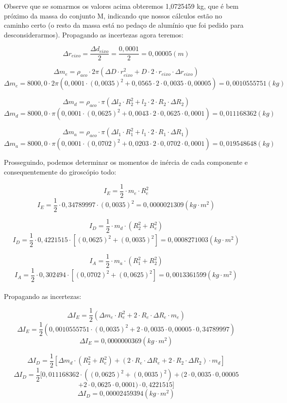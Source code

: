 Observe que se somarmos os valores acima obteremos 1,0725459 kg, que é bem próximo da massa do conjunto M, indicando que nossos cálculos estão no caminho certo (o resto da massa está no pedaço de alumínio que foi pedido para desconsiderarmos). Propagando as incertezas agora teremos:

\[\Delta r_{eixo} = \frac{\Delta d_{eixo}}{2} = \frac{0,0001}{2} = 0,00005 (m)\]

\[ \Delta m_e = \rho_{aco} \cdot 2 \pi \left( \Delta D \cdot r_{eixo}^2 + D \cdot 2 \cdot r_{eixo} \cdot \Delta r_{eixo} \right)\]
\[ \Delta m_e = 8000,0 \cdot 2 \pi \left(0,0001 \cdot (0,0035)^2 + 0,0565 \cdot 2 \cdot 0,0035 \cdot 0,00005 \right) = 0,0010555751 (kg)\]

\[ \Delta m_d = \rho_{aco} \cdot \pi \left( \Delta l_2 \cdot R_2^2 + l_2 \cdot 2 \cdot R_2 \cdot \Delta R_2 \right) \]
\[ \Delta m_d = 8000,0 \cdot \pi \left( 0,0001 \cdot (0,0625)^2 + 0,0043 \cdot 2 \cdot 0,0625 \cdot 0,0001 \right) = 0,011168362 (kg) \]

\[ \Delta m_a = \rho_{aco} \cdot \pi \left( \Delta l_1 \cdot R_1^2 + l_1 \cdot 2 \cdot R_1 \cdot \Delta R_1 \right) \]
\[ \Delta m_a = 8000,0 \cdot \pi \left( 0,0001 \cdot (0,0702)^2 + 0,0203 \cdot 2 \cdot 0,0702 \cdot 0,0001 \right) = 0,019548648 (kg)\]

Prosseguindo, podemos determinar os momentos de inércia de cada componente e consequentemente do giroscópio todo:

\[I_E = \frac{1}{2} \cdot m_e \cdot R_e^2\]
\[I_E = \frac{1}{2} \cdot 0,34789997 \cdot (0,0035)^2 = 0,0000021309 (kg \cdot m^2)\]

\[I_D = \frac{1}{2} \cdot m_d \cdot (R_2^2 + R_e^2)\]
\[I_D = \frac{1}{2} \cdot 0,4221515 \cdot [(0,0625)^2 + (0,0035)^2] = 0,0008271003 (kg \cdot m^2) \]

\[I_A = \frac{1}{2} \cdot m_a \cdot (R_1^2 + R_2^2)\]
\[I_A = \frac{1}{2} \cdot 0,302494 \cdot [(0,0702)^2 + (0,0625)^2] = 0,0013361599 (kg \cdot m^2) \]\\

Propagando as incertezas:

\[\Delta I_E = \frac{1}{2} \left( \Delta m_e \cdot R_e^2 + 2 \cdot R_e \cdot \Delta R_e \cdot m_e \right)\]
\[\Delta I_E = \frac{1}{2} \left( 0,0010555751 \cdot (0,0035)^2 + 2 \cdot 0,0035 \cdot 0,00005 \cdot 0,34789997 \right)\]
\[\Delta I_E = 0,0000000369 (kg \cdot m^2)\]

\[\Delta I_D = \frac{1}{2} 
    \left[ 
        \Delta m_d \cdot (R_2^2 + R_e^2) + 
        \left( 2 \cdot R_e \cdot \Delta R_e + 2 \cdot R_2 \cdot \Delta R_2 \right) \cdot m_d
    \right]
\]
\[\Delta I_D = \frac{1}{2} 
    [ 
        0,011168362 \cdot ((0,0625)^2 + (0,0035)^2) + ( 2 \cdot 0,0035 \cdot 0,00005
\]\[
         + 2 \cdot 0,0625 \cdot 0,0001) \cdot 0,4221515
    ]
\]
\[\Delta I_D = 0,00002459394 (kg \cdot m^2)\]

